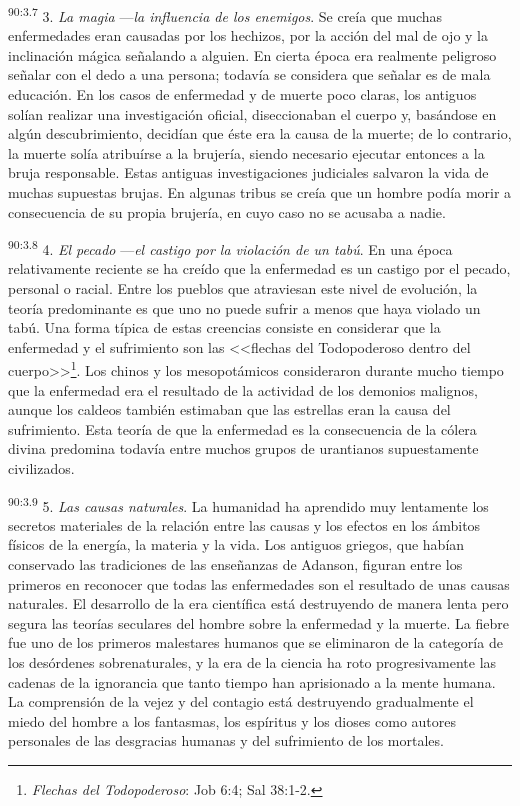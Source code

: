 \par
\textsuperscript{90:3.7} 3. \textit{La magia} ---\textit{la influencia de los enemigos}. Se creía que muchas enfermedades eran causadas por los hechizos, por la acción del mal de ojo y la inclinación mágica señalando a alguien. En cierta época era realmente peligroso señalar con el dedo a una persona; todavía se considera que señalar es de mala educación. En los casos de enfermedad y de muerte poco claras, los antiguos solían realizar una investigación oficial, diseccionaban el cuerpo y, basándose en algún descubrimiento, decidían que éste era la causa de la muerte; de lo contrario, la muerte solía atribuírse a la brujería, siendo necesario ejecutar entonces a la bruja responsable. Estas antiguas investigaciones judiciales salvaron la vida de muchas supuestas brujas. En algunas tribus se creía que un hombre podía morir a consecuencia de su propia brujería, en cuyo caso no se acusaba a nadie.

\par
\textsuperscript{90:3.8} 4. \textit{El pecado} ---\textit{el castigo por la violación de un tabú}. En una época relativamente reciente se ha creído que la enfermedad es un castigo por el pecado, personal o racial. Entre los pueblos que atraviesan este nivel de evolución, la teoría predominante es que uno no puede sufrir a menos que haya violado un tabú. Una forma típica de estas creencias consiste en considerar que la enfermedad y el sufrimiento son las <<flechas del Todopoderoso dentro del cuerpo>>\footnote{\textit{Flechas del Todopoderoso}: Job 6:4; Sal 38:1-2.}. Los chinos y los mesopotámicos consideraron durante mucho tiempo que la enfermedad era el resultado de la actividad de los demonios malignos, aunque los caldeos también estimaban que las estrellas eran la causa del sufrimiento. Esta teoría de que la enfermedad es la consecuencia de la cólera divina predomina todavía entre muchos grupos de urantianos supuestamente civilizados.

\par
\textsuperscript{90:3.9} 5. \textit{Las causas naturales}. La humanidad ha aprendido muy lentamente los secretos materiales de la relación entre las causas y los efectos en los ámbitos físicos de la energía, la materia y la vida. Los antiguos griegos, que habían conservado las tradiciones de las enseñanzas de Adanson, figuran entre los primeros en reconocer que todas las enfermedades son el resultado de unas causas naturales. El desarrollo de la era científica está destruyendo de manera lenta pero segura las teorías seculares del hombre sobre la enfermedad y la muerte. La fiebre fue uno de los primeros malestares humanos que se eliminaron de la categoría de los desórdenes sobrenaturales, y la era de la ciencia ha roto progresivamente las cadenas de la ignorancia que tanto tiempo han aprisionado a la mente humana. La comprensión de la vejez y del contagio está destruyendo gradualmente el miedo del hombre a los fantasmas, los espíritus y los dioses como autores personales de las desgracias humanas y del sufrimiento de los mortales.

